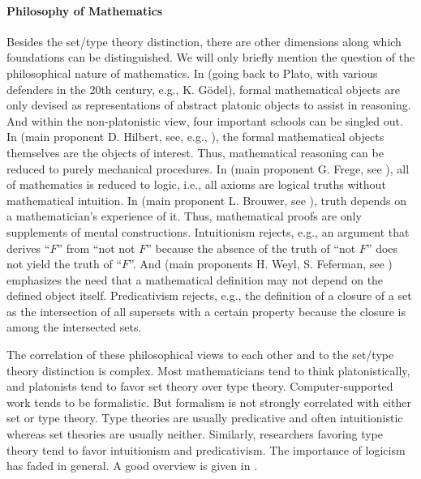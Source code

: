 \paragraph{Philosophy of Mathematics}
Besides the set/type theory distinction, there are other dimensions along which foundations can be distinguished. We will only briefly mention the question of the philosophical nature of mathematics. In  (going back to Plato, with various defenders in the 20th century, e.g., K. G\"odel), formal mathematical objects are only devised as representations of abstract platonic objects to assist in reasoning. And within the non-platonistic view, four important schools can be singled out. In  (main proponent D. Hilbert, see, e.g., \cite{hilbertsprogram}), the formal mathematical objects themselves are the objects of interest. Thus, mathematical reasoning can be reduced to purely mechanical procedures. In  (main proponent G. Frege, see \cite{logicism}), all of mathematics is reduced to logic, i.e., all axioms are logical truths without mathematical intuition. In  (main proponent L. Brouwer, see \cite{brouwer}), truth depends on a mathematician's experience of it. Thus, mathematical proofs are only supplements of mental constructions. Intuitionism rejects, e.g., an argument that derives ``$F$'' from ``not not $F$'' because the absence of the truth of ``not $F$'' does not yield the truth of ``$F$''. And  (main proponents H. Weyl, S. Feferman, see \cite{predicativism,predicativism2}) emphasizes the need that a mathematical definition may not depend on the defined object itself. Predicativism rejects, e.g., the definition of a closure of a set as the intersection of all supersets with a certain property because the closure is among the intersected sets.

The correlation of these philosophical views to each other and to the set/type theory distinction is complex. Most mathematicians tend to think platonistically, and platonists tend to favor set theory over type theory. Computer-supported work tends to be formalistic. But formalism is not strongly correlated with either set or type theory. Type theories are usually predicative and often intuitionistic whereas set theories are usually neither. Similarly, researchers favoring type theory tend to favor intuitionism and predicativism. The importance of logicism has faded in general. A good overview is given in \cite{sep_philosophy}.

